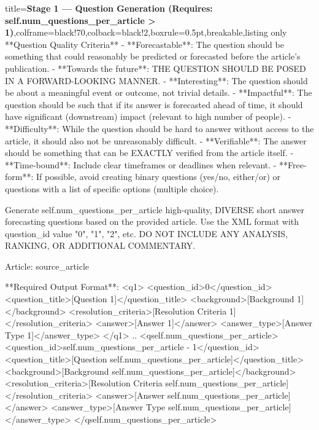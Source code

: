 \documentclass{article} %
\begin{document}
\begin{tcblisting}{title={\textbf{Stage 1 --- Question Generation (Requires:  self.num\_questions\_per\_article > 1)}},colframe=black!70,colback=black!2,boxrule=0.5pt,breakable,listing only}
**Question Quality Criteria**
- **Forecastable**: The question should be something that could reasonably be predicted or forecasted before the article's publication.
- **Towards the future**: THE QUESTION SHOULD BE POSED IN A FORWARD-LOOKING MANNER.
- **Interesting**: The question should be about a meaningful event or outcome, not trivial details.
- **Impactful**: The question should be such that if its answer is forecasted ahead of time, it should have significant (downstream) impact (relevant to high number of people).
- **Difficulty**: While the question should be hard to answer without access to the article, it should also not be unreasonably difficult.
- **Verifiable**: The answer should be something that can be EXACTLY verified from the article itself.
- **Time-bound**: Include clear timeframes or deadlines when relevant.
- **Free-form**: If possible, avoid creating binary questions (yes/no, either/or) or questions with a list of specific options (multiple choice).

Generate {self.num_questions_per_article} high-quality, DIVERSE short answer forecasting questions based on the provided article. Use the XML format with question_id value "0", "1", "2", etc. DO NOT INCLUDE ANY ANALYSIS, RANKING, OR ADDITIONAL COMMENTARY.

Article:
{source_article}

**Required Output Format**:
<q1>
<question_id>0</question_id>
<question_title>[Question 1]</question_title>
<background>[Background 1]</background>
<resolution_criteria>[Resolution Criteria 1]</resolution_criteria>
<answer>[Answer 1]</answer>
<answer_type>[Answer Type 1]</answer_type>
</q1>
..
<q{self.num_questions_per_article}>
<question_id>{self.num_questions_per_article - 1}</question_id>
<question_title>[Question {self.num_questions_per_article}]</question_title>
<background>[Background {self.num_questions_per_article}]</background>
<resolution_criteria>[Resolution Criteria {self.num_questions_per_article}]</resolution_criteria>
<answer>[Answer {self.num_questions_per_article}]</answer>
<answer_type>[Answer Type {self.num_questions_per_article}]</answer_type>
</q{self.num_questions_per_article}>
\end{tcblisting}
\end{document}
